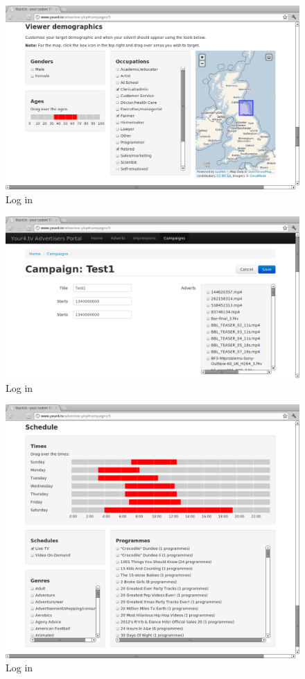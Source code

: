 \begin{figure}[th]
	\centering
	\includegraphics[width=\textwidth]{images/screenshots/advertiser-campaign-demographics.png}
	\caption{Log in}
	\label{fig:advertiser-campaign-demographics}
\end{figure}
\begin{figure}[th]
	\centering
	\includegraphics[width=\textwidth]{images/screenshots/advertiser-campaign.png}
	\caption{Log in}
	\label{fig:advertiser-campaign}
\end{figure}
\begin{figure}[th]
	\centering
	\includegraphics[width=\textwidth]{images/screenshots/advertiser-campaign-schedule.png}
	\caption{Log in}
	\label{fig:advertiser-campaign-schedule}
\end{figure}
